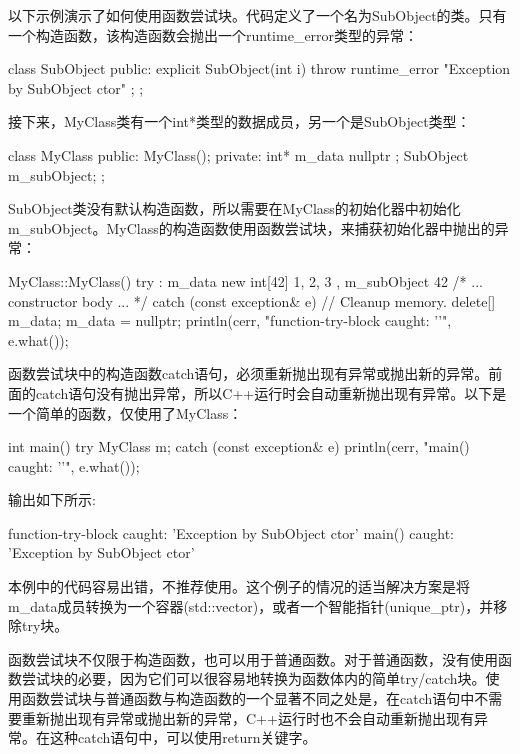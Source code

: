 以下示例演示了如何使用函数尝试块。代码定义了一个名为SubObject的类。只有一个构造函数，该构造函数会抛出一个runtime\_error类型的异常：

\begin{cpp}
class SubObject
{
    public:
        explicit SubObject(int i) {
            throw runtime_error { "Exception by SubObject ctor" }; }
};
\end{cpp}

接下来，MyClass类有一个int*类型的数据成员，另一个是SubObject类型：

\begin{cpp}
class MyClass
{
    public:
        MyClass();
    private:
        int* m_data { nullptr };
        SubObject m_subObject;
};
\end{cpp}

SubObject类没有默认构造函数，所以需要在MyClass的初始化器中初始化m\_subObject。MyClass的构造函数使用函数尝试块，来捕获初始化器中抛出的异常：

\begin{cpp}
MyClass::MyClass()
try
    : m_data { new int[42]{ 1, 2, 3 } }, m_subObject { 42 }
{
    /* ... constructor body ... */
}
catch (const exception& e)
{
    // Cleanup memory.
    delete[] m_data;
    m_data = nullptr;
    println(cerr, "function-try-block caught: '{}'", e.what());
}
\end{cpp}

函数尝试块中的构造函数catch语句，必须重新抛出现有异常或抛出新的异常。前面的catch语句没有抛出异常，所以C++运行时会自动重新抛出现有异常。以下是一个简单的函数，仅使用了MyClass：

\begin{cpp}
int main()
{
    try {
        MyClass m;
    } catch (const exception& e) {
        println(cerr, "main() caught: '{}'", e.what());
    }
}
\end{cpp}

输出如下所示:

\begin{shell}
function-try-block caught: 'Exception by SubObject ctor'
main() caught: 'Exception by SubObject ctor'
\end{shell}

本例中的代码容易出错，不推荐使用。这个例子的情况的适当解决方案是将m\_data成员转换为一个容器(std::vector)，或者一个智能指针(unique\_ptr)，并移除try块。

函数尝试块不仅限于构造函数，也可以用于普通函数。对于普通函数，没有使用函数尝试块的必要，因为它们可以很容易地转换为函数体内的简单try/catch块。使用函数尝试块与普通函数与构造函数的一个显著不同之处是，在catch语句中不需要重新抛出现有异常或抛出新的异常，C++运行时也不会自动重新抛出现有异常。在这种catch语句中，可以使用return关键字。

